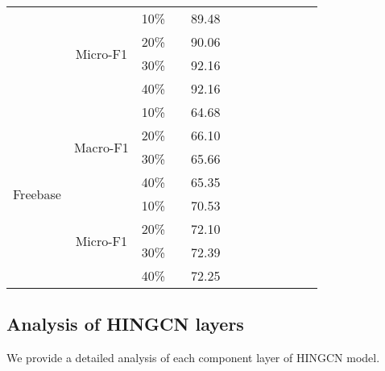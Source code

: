 \begin{table*}[!htbp]
\begin{tabular}{|c|c|c||c|c|c|c|c||c|c|c|c|}
                          & \multirow{4}{*}{Micro-F1} & 10\%     &          &   89.48      &     &     &     &        &        &        &        \\
                          &                           & 20\%     &          &   90.06      &     &     &     &        &        &        &        \\
                          &                           & 30\%     &          &   92.16      &     &     &     &        &        &        &        \\
                          &                           & 40\%     &          &   92.16      &     &     &     &        &        &        &        \\ \hline
\multirow{8}{*}{Freebase} & \multirow{4}{*}{Macro-F1} & 10\%     &          &   64.68      &     &     &     &        &        &        &        \\
                          &                           & 20\%     &          &   66.10      &     &     &     &        &        &        &        \\
                          &                           & 30\%     &          &   65.66      &     &     &     &        &        &        &        \\
                          &                           & 40\%     &          &   65.35      &     &     &     &        &        &        &        \\ \cline{2-12} 
                          & \multirow{4}{*}{Micro-F1} & 10\%     &          &   70.53      &     &     &     &        &        &        &        \\
                          &                           & 20\%     &          &   72.10      &     &     &     &        &        &        &        \\
                          &                           & 30\%     &          &   72.39      &     &     &     &        &        &        &        \\
                          &                           & 40\%     &          &   72.25      &     &     &     &        &        &        &        \\ \hline
\end{tabular}
\end{table*}

\subsection{Analysis of HINGCN layers}
We provide a detailed analysis of each component layer of HINGCN model.

